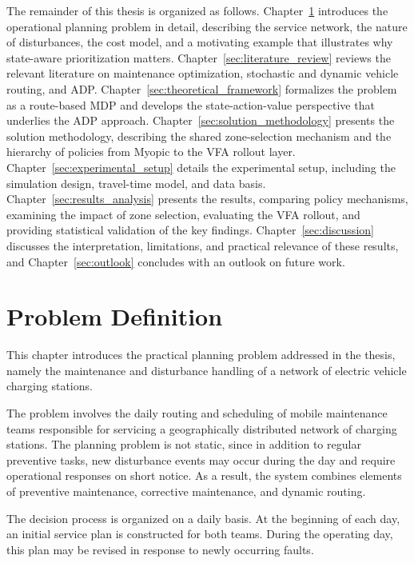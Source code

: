\documentclass[12pt,oneside]{article}
\begin{document}
The remainder of this thesis is organized as follows. Chapter~\ref{sec:problem_definition} introduces the operational planning problem in detail, describing the service network, the nature of disturbances, the cost model, and a motivating example that illustrates why state-aware prioritization matters. Chapter~\ref{sec:literature_review} reviews the relevant literature on maintenance optimization, stochastic and dynamic vehicle routing, and ADP. Chapter~\ref{sec:theoretical_framework} formalizes the problem as a route-based MDP and develops the state-action-value perspective that underlies the ADP approach. Chapter~\ref{sec:solution_methodology} presents the solution methodology, describing the shared zone-selection mechanism and the hierarchy of policies from Myopic to the VFA rollout layer. Chapter~\ref{sec:experimental_setup} details the experimental setup, including the simulation design, travel-time model, and data basis. Chapter~\ref{sec:results_analysis} presents the results, comparing policy mechanisms, examining the impact of zone selection, evaluating the VFA rollout, and providing statistical validation of the key findings. Chapter~\ref{sec:discussion} discusses the interpretation, limitations, and practical relevance of these results, and Chapter~\ref{sec:outlook} concludes with an outlook on future work.

\clearpage

\section{Problem Definition}\label{sec:problem_definition}
This chapter introduces the practical planning problem addressed in the thesis, namely the maintenance and disturbance handling of a network of electric vehicle charging stations.

The problem involves the daily routing and scheduling of mobile maintenance teams responsible for servicing a geographically distributed network of charging stations. The planning problem is not static, since in addition to regular preventive tasks, new disturbance events may occur during the day and require operational responses on short notice. As a result, the system combines elements of preventive maintenance, corrective maintenance, and dynamic routing.

The decision process is organized on a daily basis. At the beginning of each day, an initial service plan is constructed for both teams. During the operating day, this plan may be revised in response to newly occurring faults.
\end{document}
